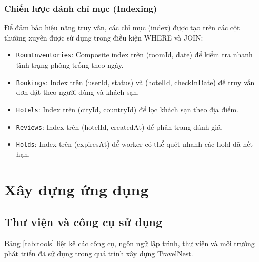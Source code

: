 \documentclass[13pt,a4paper,twoside]{report}
\begin{document}
\subsubsection{Chiến lược đánh chỉ mục (Indexing)}

Để đảm bảo hiệu năng truy vấn, các chỉ mục (index) được tạo trên các cột thường xuyên được sử dụng trong điều kiện WHERE và JOIN:

\begin{itemize}
  \item \texttt{RoomInventories}: Composite index trên (roomId, date) để kiểm tra nhanh tình trạng phòng trống theo ngày.
  \item \texttt{Bookings}: Index trên (userId, status) và (hotelId, checkInDate) để truy vấn đơn đặt theo người dùng và khách sạn.
  \item \texttt{Hotels}: Index trên (cityId, countryId) để lọc khách sạn theo địa điểm.
  \item \texttt{Reviews}: Index trên (hotelId, createdAt) để phân trang đánh giá.
  \item \texttt{Holds}: Index trên (expiresAt) để worker có thể quét nhanh các hold đã hết hạn.
\end{itemize}

\section{Xây dựng ứng dụng}

\subsection{Thư viện và công cụ sử dụng}

Bảng \ref{tab:tools} liệt kê các công cụ, ngôn ngữ lập trình, thư viện và môi trường phát triển đã sử dụng trong quá trình xây dựng TravelNest.
\end{document}
